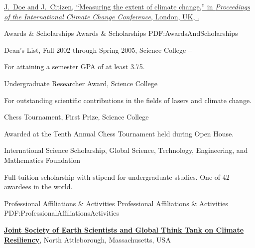 \documentclass[letterpaper,MMMyyyy,nonstopmode]{simpleresumecv}
\begin{document}
\begin{Body}
\Gap
\NumberedItem{[10]}
\href{http://www.example.com/my-paper-doi-1}
{\underline{J.~Doe} and J.~Citizen,
``Measuring the extent of climate change,''
in \textit{Proceedings of the International Climate Change Conference},
London, UK,
.}

\endgroup


\Section
{Awards \&\newline
Scholarships}
{Awards \& Scholarships}
{PDF:AwardsAndScholarships}

\BulletItem
Dean's List,
Fall 2002 through Spring 2005,
Science College
\hfill
{} --
\begin{Detail}
\Item
For attaining a semester GPA of at least 3.75.
\end{Detail}

\Gap
\BulletItem
Undergraduate Researcher Award,
Science College
\hfill
{}
\begin{Detail}
\Item
For outstanding scientific contributions in the fields of lasers and climate change.
\end{Detail}

\Gap
\BulletItem
Chess Tournament,
First Prize,
Science College
\hfill
{}
\begin{Detail}
\Item
Awarded at the Tenth Annual Chess Tournament held during Open House.
\end{Detail}

\Gap
\BulletItem
International Science Scholarship,
\hfill
{}
\newline
Global Science, Technology, Engineering, and Mathematics Foundation
\begin{Detail}
\Item
Full-tuition scholarship with stipend for undergraduate studies.
One of 42 awardees in the world.
\end{Detail}


\Section
{Professional Affiliations\newline
\& Activities}
{Professional Affiliations \& Activities}
{PDF:ProfessionalAffiliationsActivities}

\Entry
\href{http://www.example.com/my-society}
{\textbf{Joint Society of Earth Scientists and Global Think Tank on Climate Resiliency}},
\newline
North Attleborough, Massachusetts, USA


\end{Body}
\end{document}

